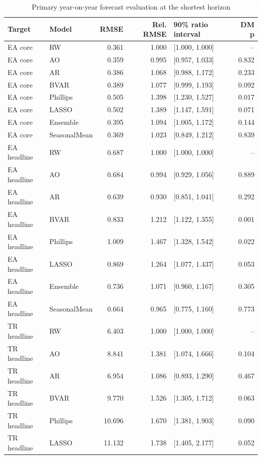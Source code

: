 \begin{table}[htbp]
\centering
\footnotesize
\caption{Primary year-on-year forecast evaluation at the shortest horizon}
\begin{tabularx}{\linewidth}{XlrrXr}
\toprule
Target & Model & RMSE & Rel. RMSE & 90\% ratio interval & DM p \\
\midrule
EA core & RW & 0.361 & 1.000 & [1.000, 1.000] & -- \\
EA core & AO & 0.359 & 0.995 & [0.957, 1.033] & 0.832 \\
EA core & AR & 0.386 & 1.068 & [0.988, 1.172] & 0.233 \\
EA core & BVAR & 0.389 & 1.077 & [0.999, 1.193] & 0.092 \\
EA core & Phillips & 0.505 & 1.398 & [1.230, 1.527] & 0.017 \\
EA core & LASSO & 0.502 & 1.389 & [1.147, 1.591] & 0.071 \\
EA core & Ensemble & 0.395 & 1.094 & [1.005, 1.172] & 0.144 \\
EA core & SeasonalMean & 0.369 & 1.023 & [0.849, 1.212] & 0.839 \\
EA headline & RW & 0.687 & 1.000 & [1.000, 1.000] & -- \\
EA headline & AO & 0.684 & 0.994 & [0.929, 1.056] & 0.889 \\
EA headline & AR & 0.639 & 0.930 & [0.851, 1.041] & 0.292 \\
EA headline & BVAR & 0.833 & 1.212 & [1.122, 1.355] & 0.001 \\
EA headline & Phillips & 1.009 & 1.467 & [1.328, 1.542] & 0.022 \\
EA headline & LASSO & 0.869 & 1.264 & [1.077, 1.437] & 0.053 \\
EA headline & Ensemble & 0.736 & 1.071 & [0.960, 1.167] & 0.305 \\
EA headline & SeasonalMean & 0.664 & 0.965 & [0.775, 1.160] & 0.773 \\
TR headline & RW & 6.403 & 1.000 & [1.000, 1.000] & -- \\
TR headline & AO & 8.841 & 1.381 & [1.074, 1.666] & 0.104 \\
TR headline & AR & 6.954 & 1.086 & [0.893, 1.290] & 0.467 \\
TR headline & BVAR & 9.770 & 1.526 & [1.305, 1.712] & 0.063 \\
TR headline & Phillips & 10.696 & 1.670 & [1.381, 1.903] & 0.090 \\
TR headline & LASSO & 11.132 & 1.738 & [1.405, 2.177] & 0.052 \\

\end{tabularx}
\end{table}
